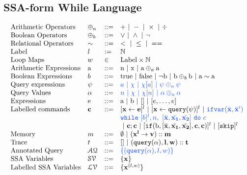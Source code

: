 \documentclass[a4paper,11pt]{article}
\begin{document}
\subsection{SSA-form While Language}
\[
\begin{array}{llll}
 \mbox{Arithmetic Operators} & \oplus_a & ::= & + ~|~ - ~|~ \times 
%
~|~ \div \\  
  \mbox{Boolean Operators} & \oplus_b & ::= & \lor ~|~ \land ~|~ \neg\\
   \mbox{Relational Operators} & \sim & ::= & < ~|~ \leq ~|~ == \\  
 \mbox{Label} & l & := & \mathbb{N} \\ 
 \mbox{Loop Maps} & w & \in & \mbox{Label} \times \mathbb{N} \\
\mbox{Arithmetic Expressions} & \saexpr & ::= & 
	\textrm{n} ~|~ \textrm{x} ~|~ \saexpr \oplus_a \saexpr  \\
\mbox{Boolean Expressions} & \bexpr & ::= & 
	\textrm{true} ~|~ \textrm{false}  ~|~ \neg \sbexpr
	 ~|~ \sbexpr \oplus_b \sbexpr
	~|~ \saexpr \sim \saexpr 
	\\
\mbox{Query expressions} & \qexpr & ::= 
& \jl{ \aexpr ~|~ \chi ~|~ \chi[\aexpr] ~|~ \qexpr \oplus_a \qexpr} 
\\
\mbox{Query Values} & \qval & ::= 
& \jl{ n ~|~ \chi ~|~ \chi[n] ~|~ \qval \oplus_a  \qval }
\\
\mbox{Expressions} & \sexpr & ::= & \saexpr \sep \sbexpr ~|~ [] ~|~ [\expr, \dots, \expr]
\\	
\mbox{Labelled commands} & \ssa{c} & ::= &   [\assign {\ssa{x}}{ \ssa{\expr}}]^{l} ~|~  [\assign {\ssa{x} } {\ssa{\query(\qexpr)}}]^{l}
%
~|~  {\jl{\eifvar(\bar{\ssa{x}}, \bar{\ssa{x}}')}} \\ 
&&& 
\jl{\ewhile ~ [ b ]^{l} , n,
~ 
[\bar{\ssa{x}}, \bar{\ssa{x_1}}, \bar{\ssa{x_2}}] 
~ \edo ~  c }
\\
&&&
~|~ \ssa{c};\ssa{c}  
~|~ [\eif(\sbexpr, [\bar{\ssa{x}}, \bar{\ssa{x_1}}, \bar{\ssa{x_2}}] , \ssa{c}, \ssa{c})]^l 
~|~ [\eskip]^{l} \\
\mbox{Memory} & m & ::= & \emptyset ~|~ \ssa{ ({x^{l}} \to v) :: m } \\
%
\mbox{Trace} & t & ::= & [] ~|~ \ssa{{(\query(\qval), l , w ) :: t}} \\
\mbox{Annotated Query} & \mathcal{AQ}  & 
::= & \jl{\{ (\query(\qval), l , w )  \} }
 \\
\mbox{SSA Variables} & \mathcal{SV}  & ::= & \{ \ssa{x} \} \\
\mbox{Labelled SSA Variables} & \mathcal{LV}  & ::= & \{ \ssa{x}^{(l,w)}  \}
\end{array}
\]
%
\end{document}
